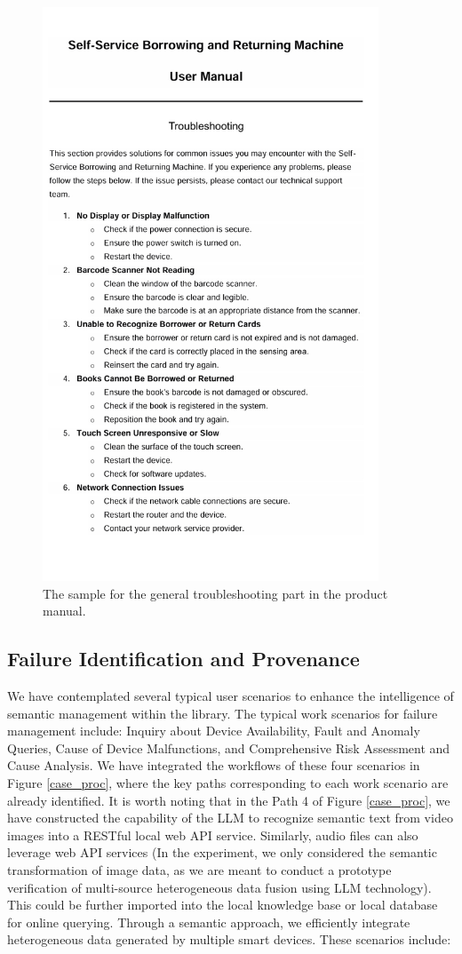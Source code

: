 \documentclass[preprint,12pt]{elsarticle}
\begin{document}
\begin{figure}[!h]
	\centering
	\includegraphics[angle=90,width=10cm]{trouble_shoot.jpg}
	\caption{The  sample for the general troubleshooting part in the product manual.}
	\label{trouble_shoot}
\end{figure}





\subsection{Failure Identification and Provenance}
We have contemplated several typical user scenarios to enhance the intelligence of semantic management within the library. The typical work scenarios for failure management include: Inquiry about Device Availability, Fault and Anomaly Queries, Cause of Device Malfunctions, and Comprehensive Risk Assessment and Cause Analysis. We have integrated the workflows of these four scenarios in Figure \ref{case_proc}, where the key paths corresponding to each work scenario are already identified. It is worth noting that in the Path 4 of Figure \ref{case_proc}, we have constructed the capability of the LLM to recognize semantic text from video images into a RESTful local web API service. Similarly, audio files can also leverage web API services (In the experiment, we only considered the semantic transformation of image data, as we are meant to conduct a prototype verification of multi-source heterogeneous data fusion using LLM technology). This could be further imported into the local knowledge base or local database for online querying. Through a semantic approach, we efficiently integrate heterogeneous data generated by multiple smart devices. These scenarios include:
\end{document}

